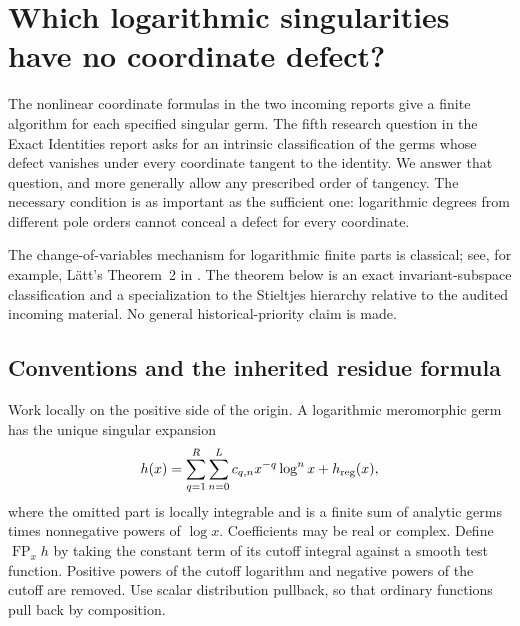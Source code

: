 \section{Which logarithmic singularities have no coordinate defect?}
\label{invg:sec}

The nonlinear coordinate formulas in the two incoming reports give a
finite algorithm for each specified singular germ.  The fifth research
question in the Exact Identities report asks for an intrinsic
classification of the germs whose defect vanishes under every coordinate
tangent to the identity.  We answer that question, and more generally
allow any prescribed order of tangency.  The necessary condition is as
important as the sufficient one: logarithmic degrees from different pole
orders cannot conceal a defect for every coordinate.

The change-of-variables mechanism for logarithmic finite parts is
classical; see, for example, L\"att's Theorem~2 in
\cite{Latt2011}.  The theorem below is an exact invariant-subspace
classification and a specialization to the Stieltjes hierarchy relative
to the audited incoming material.  No general historical-priority claim
is made.

\subsection{Conventions and the inherited residue formula}

Work locally on the positive side of the origin.  A logarithmic
meromorphic germ has the unique singular expansion
\begin{equation}\label{invg:germ}
 h(x)=\sum_{q=1}^{R}\sum_{n=0}^{L}c_{q,n}x^{-q}\log^n x+h_{\rm reg}(x),
\end{equation}
where the omitted part is locally integrable and is a finite sum of
analytic germs times nonnegative powers of $\log x$.  Coefficients may be
real or complex.  Define $\operatorname{FP}_x h$ by taking the constant
term of its cutoff integral against a smooth test function.  Positive
powers of the cutoff logarithm and negative powers of the cutoff are
removed.  Use scalar distribution pullback, so that ordinary functions
pull back by composition.


